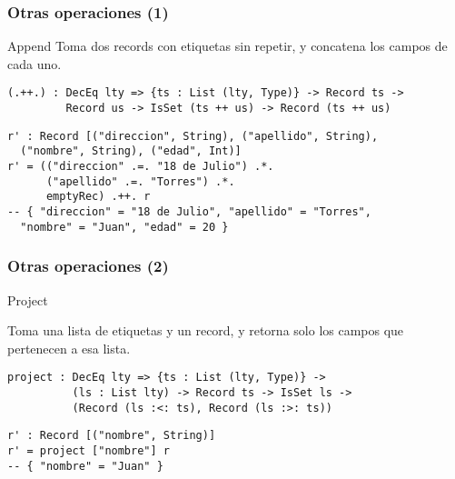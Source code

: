\documentclass{beamer}
\begin{document}
\begin{frame}[fragile]
\frametitle{Otras operaciones (1)}

\begin{block}{Append}
Toma dos records con etiquetas sin repetir, y concatena los campos de cada uno.

\begin{example}
\begin{verbatim}
(.++.) : DecEq lty => {ts : List (lty, Type)} -> Record ts -> 
         Record us -> IsSet (ts ++ us) -> Record (ts ++ us)
\end{verbatim}
\end{example}

\begin{example}[Ejemplo]
\begin{verbatim}
r' : Record [("direccion", String), ("apellido", String), 
  ("nombre", String), ("edad", Int)]
r' = (("direccion" .=. "18 de Julio") .*. 
      ("apellido" .=. "Torres") .*.
      emptyRec) .++. r
-- { "direccion" = "18 de Julio", "apellido" = "Torres",
  "nombre" = "Juan", "edad" = 20 }
\end{verbatim}
\end{example}

\end{block}

\end{frame}

\begin{frame}[fragile]
\frametitle{Otras operaciones (2)}

\begin{block}{Project}

Toma una lista de etiquetas y un record, y retorna solo los campos que pertenecen a esa lista.

\begin{example}
\begin{verbatim}
project : DecEq lty => {ts : List (lty, Type)} -> 
          (ls : List lty) -> Record ts -> IsSet ls -> 
          (Record (ls :<: ts), Record (ls :>: ts))
\end{verbatim}
\end{example}

\begin{example}[Ejemplo]
\begin{verbatim}
r' : Record [("nombre", String)]
r' = project ["nombre"] r
-- { "nombre" = "Juan" }
\end{verbatim}
\end{example}

\end{block}
\end{frame}
\end{document}
